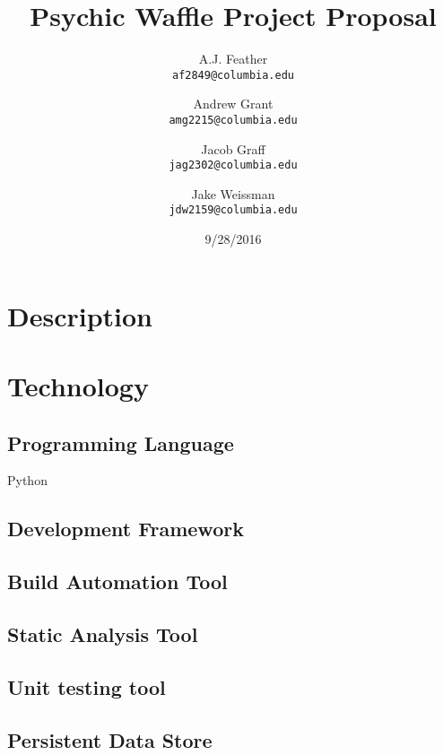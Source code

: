 \documentclass{article}
\title{Psychic Waffle Project Proposal}
\author{
	A.J. Feather\\
	\texttt{af2849@columbia.edu}
	\and
	Andrew Grant\\
	\texttt{amg2215@columbia.edu}
	\and
	Jacob Graff\\
	\texttt{jag2302@columbia.edu}
	\and
	Jake Weissman\\
	\texttt{jdw2159@columbia.edu}
}
\date{9/28/2016}
\begin{document}
\maketitle

\section{Description}

\section{Technology}

\subsection{Programming Language}
Python
\subsection{Development Framework}

\subsection{Build Automation Tool}

\subsection{Static Analysis Tool}

\subsection{Unit testing tool}

\subsection{Persistent Data Store} 
\end{document}
